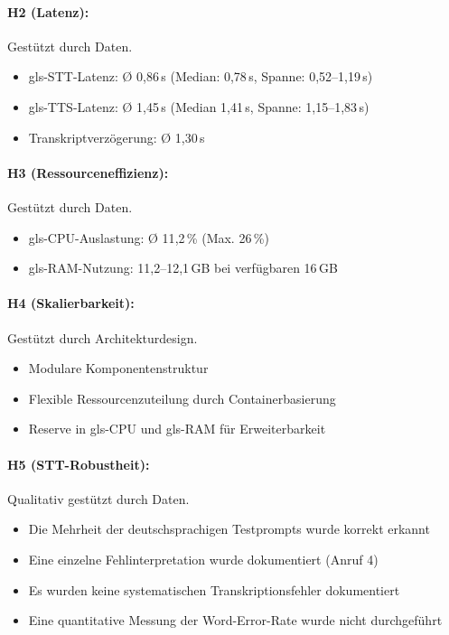 \paragraph{H2 (Latenz):} Gestützt durch Daten.
\begin{itemize}
  \item \gls{gls-STT}-Latenz: Ø 0,86\,s (Median: 0,78\,s, Spanne: 0,52--1,19\,s)
  \item \gls{gls-TTS}-Latenz: Ø 1,45\,s (Median 1,41\,s, Spanne: 1,15--1,83\,s)
  \item Transkriptverzögerung: Ø 1,30\,s
\end{itemize}

\paragraph{H3 (Ressourceneffizienz):} Gestützt durch Daten.
\begin{itemize}
  \item \gls{gls-CPU}-Auslastung: Ø 11{,}2\,\% (Max. 26\,\%)
  \item\gls{gls-RAM}-Nutzung: 11{,}2--12{,}1\,GB bei verfügbaren 16\,GB
\end{itemize}

\paragraph{H4 (Skalierbarkeit):} Gestützt durch Architekturdesign.
\begin{itemize}
  \item Modulare Komponentenstruktur
  \item Flexible Ressourcenzuteilung durch Containerbasierung
  \item Reserve in \gls{gls-CPU} und \gls{gls-RAM} für Erweiterbarkeit
\end{itemize}

\paragraph{H5 (STT-Robustheit):} Qualitativ gestützt durch Daten.
\begin{itemize}
  \item Die Mehrheit der deutschsprachigen Testprompts wurde korrekt erkannt
  \item Eine einzelne Fehlinterpretation wurde dokumentiert (Anruf 4)
  \item Es wurden keine systematischen Transkriptionsfehler dokumentiert
  \item Eine quantitative Messung der Word-Error-Rate wurde nicht durchgeführt
\end{itemize}

